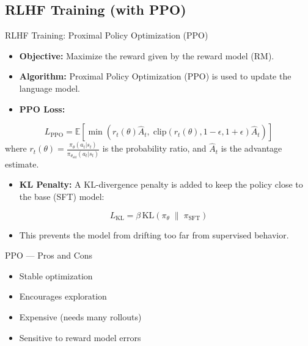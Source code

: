 \subsection{RLHF Training (with PPO)}
\begin{frame}{RLHF Training: Proximal Policy Optimization (PPO)}
    \begin{itemize}
        \item \textbf{Objective:} Maximize the reward given by the reward model (RM).
        \item \textbf{Algorithm:} Proximal Policy Optimization (PPO) is used to update the language model.
        \item \textbf{PPO Loss:}
    \end{itemize}
    \[
        L_{\mathrm{PPO}} = \mathbb{E}\left[
            \min \left(
                r_t(\theta) \hat{A}_t,\;
                \mathrm{clip}\left(r_t(\theta), 1 - \epsilon, 1 + \epsilon\right) \hat{A}_t
            \right)
        \right]
    \]
    where $r_t(\theta) = \frac{\pi_\theta(a_t|s_t)}{\pi_{\theta_{\mathrm{old}}}(a_t|s_t)}$ is the probability ratio, and $\hat{A}_t$ is the advantage estimate.
    \begin{itemize}
        \item \textbf{KL Penalty:} A KL-divergence penalty is added to keep the policy close to the base (SFT) model:
    \end{itemize}
    \[
        L_{\mathrm{KL}} = \beta\, \mathrm{KL}\left(\pi_\theta \;\|\; \pi_{\mathrm{SFT}}\right)
    \]
    \begin{itemize}
        \item This prevents the model from drifting too far from supervised behavior.
    \end{itemize}
\end{frame}


\begin{frame}{PPO — Pros and Cons}
    \begin{itemize}
        \item[\checkmark] Stable optimization
        \item[\checkmark] Encourages exploration
        \item[\texttimes] Expensive (needs many rollouts)
        \item[\texttimes] Sensitive to reward model errors
    \end{itemize}
\end{frame}


